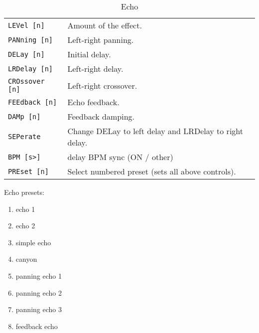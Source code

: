    \begin{table}[H]
      \centering
      \caption{Echo}
      \begin{tabular}{l l}
\texttt{LEVel [n]} &
   Amount of the effect. \\
\texttt{PANning [n]} &
   Left-right panning. \\
\texttt{DELay [n]} &
   Initial delay. \\
\texttt{LRDelay [n]} &
   Left-right delay. \\
\texttt{CROssover [n]} &
   Left-right crossover. \\
\texttt{FEEdback [n]} &
   Echo feedback. \\
\texttt{DAMp [n]} &
   Feedback damping. \\
\texttt{SEPerate} &
   Change DELay to left delay and LRDelay to right delay. \\
\texttt{BPM [s>]} &
   delay BPM sync (ON / other) \\
\texttt{PREset [n]} &
   Select numbered preset (sets all above controls). \\
      \end{tabular}
   \end{table}
Echo presets:
   \begin{enumerate}
      \item echo 1
      \item echo 2
      \item simple echo
      \item canyon
      \item panning echo 1
      \item panning echo 2
      \item panning echo 3
      \item feedback echo
    \end{enumerate}

